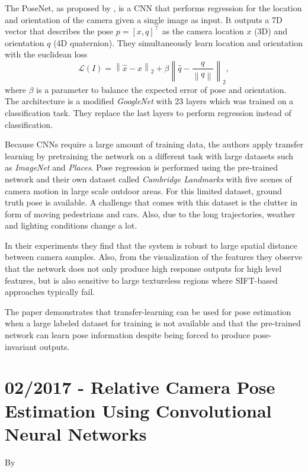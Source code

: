 			The PoseNet, as proposed by \cite{kendall2015posenet}, is a CNN that performs regression for the location and orientation of the camera given a single image as input.
			It outputs a 7D vector that describes the pose $p = [x, q]^\top$ as the camera location $x$ (3D) and orientation $q$ (4D quaternion).
			They simultaneously learn location and orientation with the euclidean loss
			\begin{equation}
				\mathcal{L}(I) = 
				\left\|
					\hat{x} - x 
				\right\|_2 
				+ \beta 
				\left\| 
					\hat{q} - \frac{q}{\left\| q \right\|} 
				\right\|_2,
			\end{equation}
			where $\beta$ is a parameter to balance the expected error of pose and orientation.
			The architecture is a modified \emph{GoogleNet} with 23 layers which was trained on a classification task.
			They replace the last layers to perform regression instead of classification.
			
			Because CNNs require a large amount of training data, the authors apply transfer learning by pretraining the network on a different task with large datasets such as \emph{ImageNet} and \emph{Places}.
			Pose regression is performed using the pre-trained network and their own dataset called \emph{Cambridge Landmarks} with five scenes of camera motion in large scale outdoor areas.
			For this limited dataset, ground truth pose is available.
			A challenge that comes with this dataset is the clutter in form of moving pedestrians and cars.
			Also, due to the long trajectories, weather and lighting conditions change a lot.
			
			In their experiments they find that the system is robust to large spatial distance between camera samples.
			Also, from the visualization of the features they observe that the network does not only produce high response outputs for high level features, but is also sensitive to large textureless regions where {SIFT}-based approaches typically fail.
			
			The paper demonstrates that transfer-learning can be used for pose estimation when a large labeled dataset for training is not available and that the pre-trained network can learn pose information despite being forced to produce pose-invariant outputs.
		
		\section{02/2017 - Relative Camera Pose Estimation Using Convolutional Neural Networks}
			By \cite{melekhov2017poseCNN}
			\\
		
		
		
		
		
